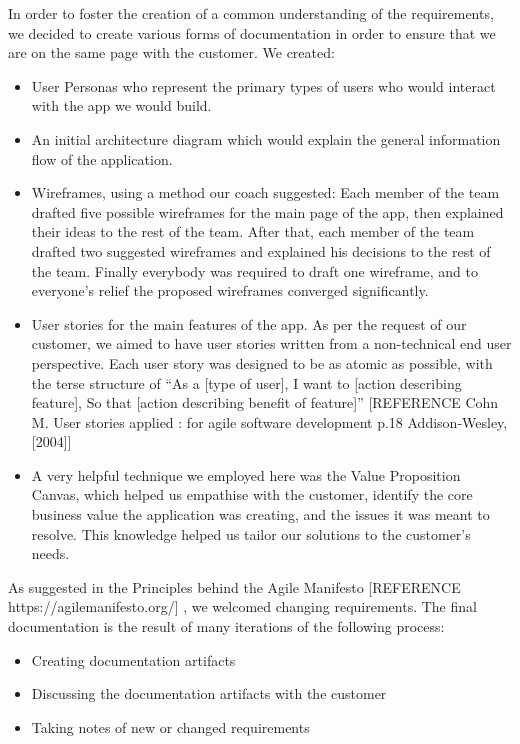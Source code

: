 \documentclass{l3proj}
\begin{document}
In order to foster the creation of a common understanding of the requirements, we decided to create various forms of documentation in order to ensure that we are on the same page with the customer. We created:
\begin{itemize}
\item User Personas who represent the primary types of users who would interact with the app we would build.
\item An initial architecture diagram which would explain the general information flow of the application.
\item Wireframes, using a method our coach suggested: 
Each member of the team drafted five possible wireframes for the main page of the app, then explained their ideas to the rest of the team. After that, each member of the team drafted two suggested wireframes and explained his decisions to the rest of the team.
Finally everybody was required to draft one wireframe, and to everyone’s relief the proposed wireframes converged significantly.
\item User stories for the main features of the app. As per the request of our customer, we aimed to have user stories written from a non-technical end user perspective. Each user story was designed to be as atomic as possible, with the terse structure of ``As a [type of user], I want to [action  describing  feature], So that [action  describing  benefit  of  feature]'' [REFERENCE Cohn M. User stories applied : for agile software development p.18 Addison-Wesley, [2004]]
\item A very helpful technique we employed here was the Value Proposition Canvas, which helped us empathise with the customer, identify the core business value the application was creating, and the issues it was meant to resolve. This knowledge helped us tailor our solutions to the customer’s needs.
\end{itemize}

As suggested in the Principles behind the Agile Manifesto [REFERENCE https://agilemanifesto.org/] , we welcomed changing requirements.
The final documentation is the result of many iterations of the following process:
\begin{itemize}
\item Creating documentation artifacts
\item Discussing the documentation artifacts with the customer
\item Taking notes of new or changed requirements
\end{itemize}
\end{document}
